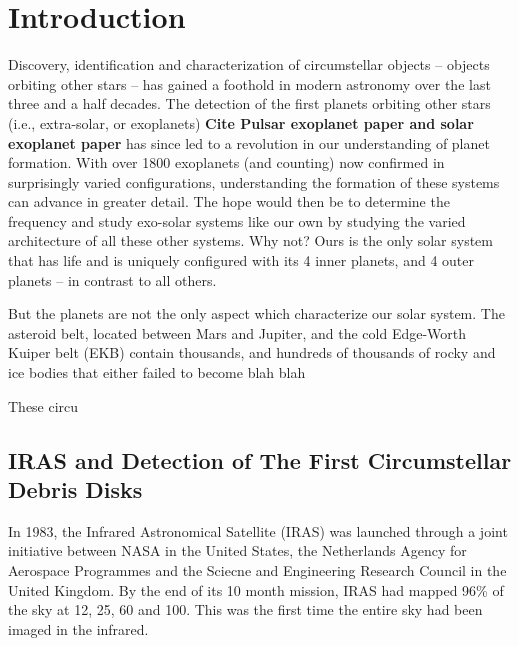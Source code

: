\section{Introduction}\label{sec:intro}
    
    Discovery, identification and characterization of circumstellar objects -- objects orbiting other stars -- has gained a foothold in modern astronomy over the last three and a half decades. The detection of the first planets orbiting other stars (i.e., extra-solar, or exoplanets) \textbf{Cite Pulsar exoplanet paper and solar exoplanet paper} has since led to a revolution in our understanding of planet formation. With over 1800 exoplanets (and counting) now confirmed in surprisingly varied configurations, understanding the formation of these systems can advance in greater detail. The hope would then be to determine the frequency and study exo-solar systems like our own by studying the varied architecture of all these other systems. Why not? Ours is the only solar system that has life and is uniquely configured with its 4 inner planets, and 4 outer planets -- in contrast to all others. 
    
    But the planets are not the only aspect which characterize our solar system. The asteroid belt, located between Mars and Jupiter, and the cold Edge-Worth Kuiper belt (EKB) contain thousands, and hundreds of thousands of rocky and ice bodies that either failed to become blah blah
    
    
    These circu
    
    \subsection{IRAS and Detection of The First Circumstellar Debris Disks }\label{sec:1stdisk_iras}
    In 1983, the Infrared Astronomical Satellite (IRAS) was launched through a joint initiative between NASA in the United States, the Netherlands Agency for Aerospace Programmes and the Sciecne and Engineering Research Council in the United Kingdom. By the end of its 10 month mission, IRAS had mapped 96\% of the sky at 12, 25, 60 and 100\micron. This was the first time the entire sky had been imaged in the infrared. 
    

